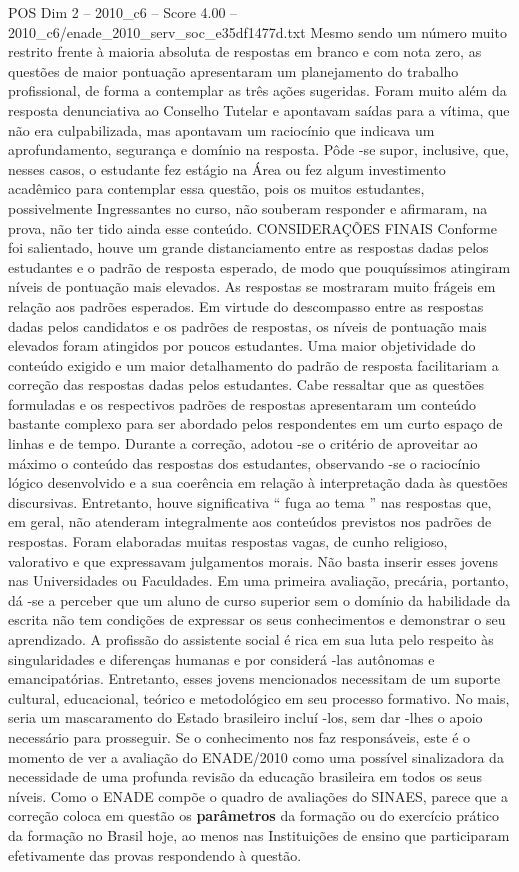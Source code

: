 \begin{textsample}{POS Dim 2 – 2010\_c6 – Score 4.00 – 2010\_c6/enade\_2010\_serv\_soc\_e35df1477d.txt}
Mesmo sendo um número muito restrito frente à maioria absoluta de respostas em branco e com nota zero, as questões de maior pontuação apresentaram um planejamento do trabalho profissional, de forma a contemplar as três ações sugeridas.
Foram muito além da resposta denunciativa ao Conselho Tutelar e apontavam saídas para a vítima, que não era culpabilizada, mas apontavam um raciocínio que indicava um aprofundamento, segurança e domínio na resposta.
Pôde -se supor, inclusive, que, nesses casos, o estudante fez estágio na Área ou fez algum investimento acadêmico para contemplar essa questão, pois os muitos estudantes, possivelmente Ingressantes no curso, não souberam responder e afirmaram, na prova, não ter tido ainda esse conteúdo.
CONSIDERAÇÕES FINAIS Conforme foi salientado, houve um grande distanciamento entre as respostas dadas pelos estudantes e o padrão de resposta esperado, de modo que pouquíssimos atingiram níveis de pontuação mais elevados.
As respostas se mostraram muito frágeis em relação aos padrões esperados.
Em virtude do descompasso entre as respostas dadas pelos candidatos e os padrões de respostas, os níveis de pontuação mais elevados foram atingidos por poucos estudantes.
Uma maior objetividade do conteúdo exigido e um maior detalhamento do padrão de resposta facilitariam a correção das respostas dadas pelos estudantes.
Cabe ressaltar que as questões formuladas e os respectivos padrões de respostas apresentaram um conteúdo bastante complexo para ser abordado pelos respondentes em um curto espaço de linhas e de tempo.
Durante a correção, adotou -se o critério de aproveitar ao máximo o conteúdo das respostas dos estudantes, observando -se o raciocínio lógico desenvolvido e a sua coerência em relação à interpretação dada às questões discursivas.
Entretanto, houve significativa “ fuga ao tema ” nas respostas que, em geral, não atenderam integralmente aos conteúdos previstos nos padrões de respostas.
Foram elaboradas muitas respostas vagas, de cunho religioso, valorativo e que expressavam julgamentos morais.
Não basta inserir esses jovens nas Universidades ou Faculdades.
Em uma primeira avaliação, precária, portanto, dá -se a perceber que um aluno de curso superior sem o domínio da habilidade da escrita não tem condições de expressar os seus conhecimentos e demonstrar o seu aprendizado.
A profissão do assistente social é rica em sua luta pelo respeito às singularidades e diferenças humanas e por considerá -las autônomas e emancipatórias.
Entretanto, esses jovens mencionados necessitam de um suporte cultural, educacional, teórico e metodológico em seu processo formativo.
No mais, seria um mascaramento do Estado brasileiro incluí -los, sem dar -lhes o apoio necessário para prosseguir.
Se o conhecimento nos faz responsáveis, este é o momento de ver a avaliação do ENADE/2010 como uma possível sinalizadora da necessidade de uma profunda revisão da educação brasileira em todos os seus níveis.
Como o ENADE compõe o quadro de avaliações do SINAES, parece que a correção coloca em questão os \textbf{parâmetros} da formação ou do exercício prático da formação no Brasil hoje, ao menos nas Instituições de ensino que participaram efetivamente das provas respondendo à questão.


\end{textsample}

